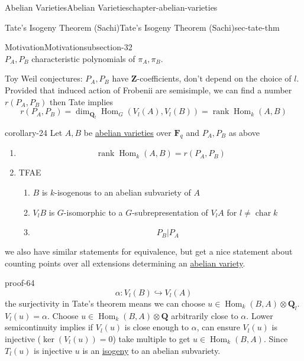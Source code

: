 \documentclass[oneside,10pt,]{book}
\numberwithin{equation}{section}
\newcommand{\ZZ}{\mathbf{Z}}
\newcommand{\QQ}{\mathbf{Q}}
\newcommand{\FF}{\mathbf{F}}
\DeclareMathOperator{\Hom}{Hom}
\DeclareMathOperator{\rank}{rank}
\DeclareMathOperator{\characteristic}{char}
\begin{document}
\begin{chapterptx}{Abelian Varieties}{}{Abelian Varieties}{}{}{chapter-abelian-varieties}
\begin{sectionptx}{Tate's Isogeny Theorem (Sachi)}{}{Tate's Isogeny Theorem (Sachi)}{}{}{sec-tate-thm}
\begin{subsectionptx}{Motivation}{}{Motivation}{}{}{subsection-32}
\begin{equation*}
\end{equation*}
\(P_A,P_B\) characteristic polynomials of \(\pi_A,\pi_B\).%
\par
\hypertarget{p-379}{}%
Toy Weil conjectures: \(P_A, P_B\) have \(\ZZ\)-coefficients, don't depend on the choice of \(l\). Provided that induced action of Frobenii are semisimple, we can find a number \(r(P_A,P_B)\) then Tate implies%
\begin{equation*}
r(P_A,P_B) = \dim_{\QQ_l} \Hom_G (V_l(A), V_l(B)) = \rank \Hom_k(A,B)
\end{equation*}
%
\begin{corollary}{}{}{corollary-24}%
\hypertarget{p-380}{}%
Let \(A, B\) be \hyperref[def-buntes-abvar]{abelian varieties} over \(\FF_q\) and \(P_A, P_B\) as above\leavevmode%
\begin{enumerate}
\item\hypertarget{li-66}{}%
\begin{equation*}
\rank \Hom_k(A,B) = r(P_A,P_B)
\end{equation*}
%
\item\hypertarget{li-67}{}\hypertarget{p-381}{}%
TFAE%
\begin{enumerate}
\item\hypertarget{li-68}{}\(B\) is \(k\)-isogenous to an abelian subvariety of \(A\)%
\item\hypertarget{li-69}{}\(V_lB\) is \(G\)-isomorphic to a \(G\)-subrepresentation of \(V_lA\) for \(l \ne \characteristic k\)%
\item\hypertarget{li-70}{}%
\begin{equation*}
P_B | P_A
\end{equation*}
%
\end{enumerate}
%
\end{enumerate}
we also have similar statements for equivalence, but get a nice statement about counting points over all extensions determining an \hyperref[def-buntes-abvar]{abelian variety}.%
\end{corollary}
\begin{proofptx}{}{proof-64}
\hypertarget{p-382}{}%
%
\begin{equation*}
\alpha \colon V_l(B)\hookrightarrow V_l(A)
\end{equation*}
the surjectivity in Tate's theorem means we can choose \(u \in \Hom_k(B,A) \otimes \QQ_l\). \(V_l(u) = \alpha\). Choose \(u \in \Hom_k(B,A) \otimes \QQ\) arbitrarily close to \(\alpha\). Lower semicontinuity implies if \(V_l(u)\) is close enough to \(\alpha\), can ensure \(V_l(u)\) is injective (\(\ker (V_l (u)) = 0\)) take multiple to get \(u \in \Hom_k(B,A)\). Since \(T_l (u)\) is injective \(u \) is an \hyperref[def-supersing-isog-isog]{isogeny} to an abelian subvariety.%

\end{proofptx}
\end{subsectionptx}
\end{sectionptx}
\end{chapterptx}
\end{document}
